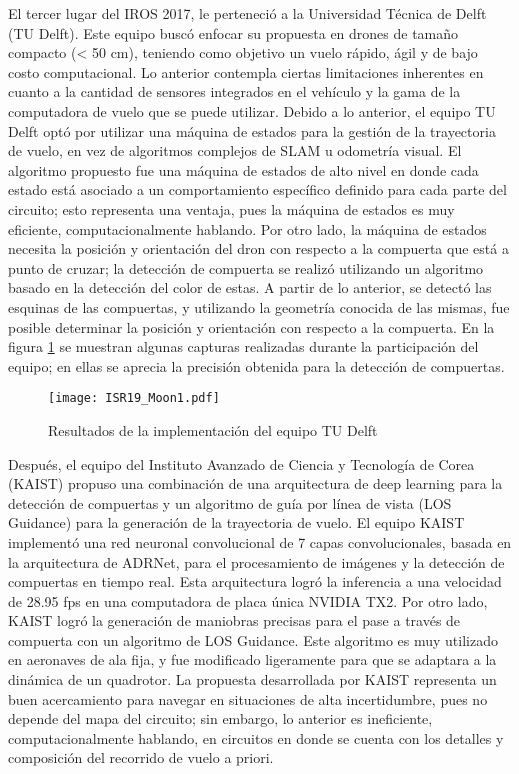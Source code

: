 El tercer lugar del IROS 2017, le perteneció a la Universidad Técnica de Delft (TU Delft). Este equipo buscó enfocar su propuesta en drones de tamaño compacto (< 50 cm), teniendo como objetivo un vuelo rápido, ágil y de bajo costo computacional. Lo anterior contempla ciertas limitaciones inherentes en cuanto a la cantidad de sensores integrados en el vehículo y la gama de la computadora de vuelo que se puede utilizar.
Debido a lo anterior, el equipo TU Delft optó por utilizar una máquina de estados para la gestión de la trayectoria de vuelo, en vez de algoritmos complejos de SLAM u odometría visual. El algoritmo propuesto fue una máquina de estados de alto nivel en donde cada estado está asociado a un comportamiento específico definido para cada parte del circuito; esto representa una ventaja, pues la máquina de estados es muy eficiente, computacionalmente hablando. 
Por otro lado, la máquina de estados necesita la posición y orientación del dron con respecto a la compuerta que está a punto de cruzar; la detección de compuerta se realizó utilizando un algoritmo basado en la detección del color de estas. A partir de lo anterior, se detectó las esquinas de las compuertas, y utilizando la geometría conocida de las mismas, fue posible determinar la posición y orientación con respecto a la compuerta. En la figura \ref{fig:ISR19_Moon1} se muestran algunas capturas realizadas durante la participación del equipo; en ellas se aprecia la precisión obtenida para la detección de compuertas.

\begin{figure}[ht]
    \centering
    \texttt{[image: ISR19\_Moon1.pdf]}
    \caption{Resultados de la implementación del equipo TU Delft \cite{moon2019challenges}}
    \label{fig:ISR19_Moon1}
\end{figure}

Después, el equipo del Instituto Avanzado de Ciencia y Tecnología de Corea (KAIST) propuso una combinación de una arquitectura de deep learning para la detección de compuertas y un algoritmo de guía por línea de vista (LOS Guidance) para la generación de la trayectoria de vuelo.
 El equipo KAIST implementó una red neuronal convolucional de 7 capas convolucionales, basada en la arquitectura de ADRNet, para el procesamiento de imágenes y la detección de compuertas en tiempo real. Esta arquitectura logró la inferencia a una velocidad de 28.95 fps en una computadora de placa única NVIDIA TX2. 
Por otro lado, KAIST logró la generación de maniobras precisas para el pase a través de compuerta con un algoritmo de LOS Guidance. Este algoritmo es muy utilizado en aeronaves de ala fija, y fue modificado ligeramente para que se adaptara a la dinámica de un quadrotor.
La propuesta desarrollada por KAIST representa un buen acercamiento para navegar en situaciones de alta incertidumbre, pues no depende del mapa del circuito; sin embargo, lo anterior es ineficiente, computacionalmente hablando, en circuitos en donde se cuenta con los detalles y composición del recorrido de vuelo a priori.

